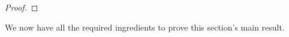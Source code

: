 \begin{proof}
\end{proof}

\medskip
We now have all the required ingredients to prove this section's main result.

